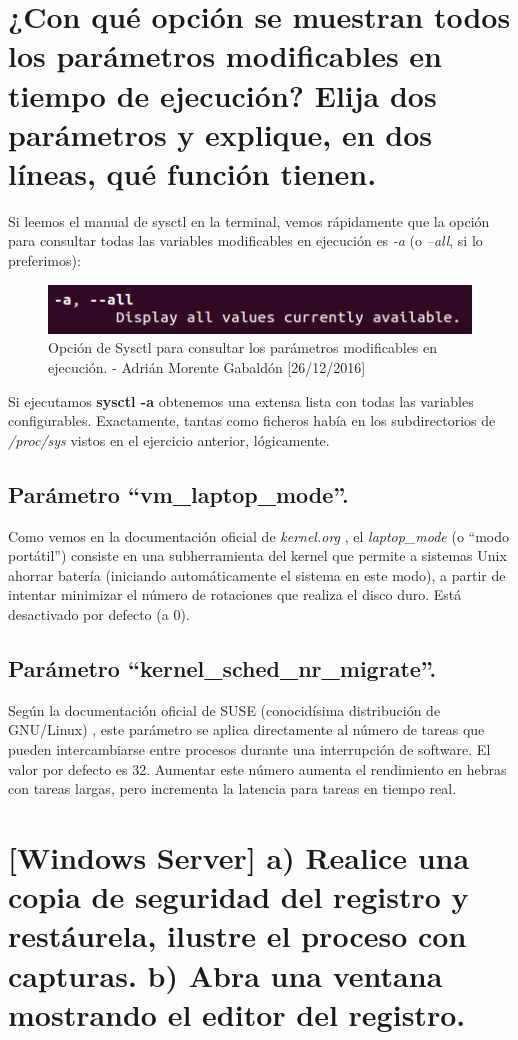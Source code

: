 \section{¿Con qué opción se muestran todos los parámetros modificables en tiempo de ejecución? Elija dos parámetros y explique, en dos líneas, qué función tienen.}
Si leemos el manual de sysctl en la terminal, vemos rápidamente que la opción para consultar todas las variables modificables en ejecución es \emph{-a} (o \emph{--all}, si lo preferimos):
\begin{figure}[H]
	\centering
	\includegraphics[scale=0.7]{sysctl-a}
	\caption{Opción de Sysctl para consultar los parámetros modificables en ejecución. - Adrián Morente Gabaldón [26/12/2016]}
	\label{figura2}
\end{figure}
Si ejecutamos \textbf{sysctl -a} obtenemos una extensa lista con todas las variables configurables. Exactamente, tantas como ficheros había en los subdirectorios de \emph{/proc/sys} vistos en el ejercicio anterior, lógicamente.
	\subsection{Parámetro ``vm\_laptop\_mode''.}
	Como vemos en la documentación oficial de \emph{kernel.org} \cite{kernellaptop}, el \emph{laptop\_mode} (o ``modo portátil'') consiste en una subherramienta del kernel que permite a sistemas Unix ahorrar batería (iniciando automáticamente el sistema en este modo), a partir de intentar minimizar 	el número de rotaciones que realiza el disco duro. Está desactivado por defecto (a 0).
	\subsection{Parámetro ``kernel\_sched\_nr\_migrate''.}
	Según la documentación oficial de SUSE (conocidísima distribución de GNU/Linux) \cite{kernelsched}, este parámetro se aplica directamente al número de tareas que pueden intercambiarse entre procesos durante una interrupción de software. El valor por defecto es 32. Aumentar este número aumenta el rendimiento en hebras con tareas largas, pero incrementa la latencia para tareas en tiempo real.


\section{[Windows Server] a) Realice una copia de seguridad del registro y restáurela, ilustre el proceso con capturas. b) Abra una ventana mostrando el editor del registro.}
